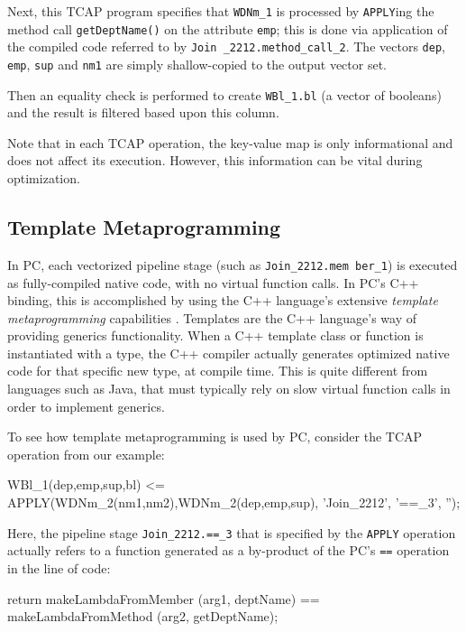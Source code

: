 Next, this TCAP program
specifies that \texttt{WDNm\_1} is processed by \texttt{APPLY}ing the
method call \texttt{getDeptName()} on the attribute \texttt{emp}; this is 
done via application of the compiled code referred to by \texttt{Join
  \_2212.method\_call\_2}.  
The vectors \texttt{dep}, \texttt{emp}, \texttt{sup}
and \texttt{nm1} are simply shallow-copied to the output vector set.

Then an equality check is performed to create \texttt{WBl\_1.bl}
(a vector of booleans) and the result is filtered based upon this
column.


Note that in each TCAP operation, the key-value map is only
informational and does not affect its execution.  However, this
information can be vital during optimization.  

\subsection{Template Metaprogramming}

In PC,
each vectorized pipeline stage (such as \texttt{Join\_2212.mem ber\_1}) is executed as fully-compiled native code, with no virtual function
calls.
In PC's C++ binding, this is accomplished by using the C++ language's extensive \emph{template metaprogramming} 
capabilities \cite{josuttis2012c++}.  Templates are the C++ language's way of providing generics functionality.
When a C++ template class or
function is instantiated with a type, %
the C++ compiler actually generates optimized native code for that specific new type, at compile time.  
This is quite different from languages
such as Java, that must typically rely on slow virtual
function calls in order to implement generics.

To see how template metaprogramming is used by PC, consider
the TCAP operation from our example:

\begin{codesmall}
WBl_1(dep,emp,sup,bl) <= 
   APPLY(WDNm_2(nm1,nm2),WDNm_2(dep,emp,sup), 
      'Join_2212', '==_3', '');
\end{codesmall}

\noindent
Here, the pipeline stage \texttt{Join\_2212.==\_3} that is specified by the \texttt{APPLY} operation
actually refers to a function generated as a by-product of the
PC's \texttt{==} operation
in the line of code:

\begin{codesmall} 
return makeLambdaFromMember (arg1, deptName) == 
    makeLambdaFromMethod (arg2, getDeptName); 
\end{codesmall}

